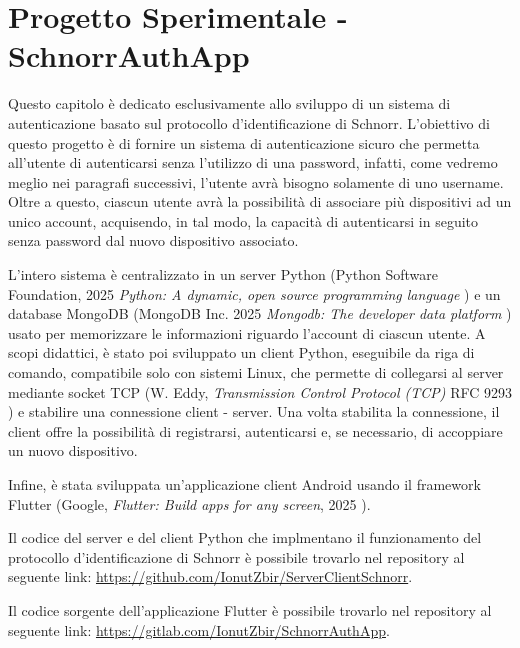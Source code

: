 \chapter{Progetto Sperimentale - SchnorrAuthApp}


Questo capitolo è dedicato esclusivamente allo sviluppo di un sistema di autenticazione basato sul protocollo d'identificazione di Schnorr. L'obiettivo di questo progetto è di fornire un sistema di autenticazione sicuro che permetta all'utente di autenticarsi senza l'utilizzo di una password, infatti, come vedremo meglio nei paragrafi successivi, l'utente avrà bisogno solamente di uno username. Oltre a questo, ciascun utente avrà la possibilità di associare più dispositivi ad un unico account, acquisendo, in tal modo, la capacità di autenticarsi in seguito senza password dal nuovo dispositivo associato.

L'intero sistema è centralizzato in un server Python (Python Software Foundation, 2025 \textit{Python: A dynamic, open source programming
	language} \cite{python}) e un database MongoDB (MongoDB Inc. 2025 \textit{Mongodb: The developer data platform} \cite{mongodb}) usato per memorizzare le informazioni riguardo l'account di ciascun utente. A scopi didattici, è stato poi sviluppato un client Python, eseguibile da riga di comando, compatibile solo con sistemi Linux, che permette di collegarsi al server mediante socket TCP (W. Eddy, \textit{Transmission Control Protocol (TCP)} RFC 9293 \cite{rfc9293}) e stabilire una connessione client - server. Una volta stabilita la connessione, il client offre la possibilità di registrarsi, autenticarsi e, se necessario, di accoppiare un nuovo dispositivo.

Infine, è stata sviluppata un'applicazione client Android usando il framework Flutter (Google, \textit{Flutter: Build apps for any screen}, 2025 \cite{flutter}).

Il codice del server e del client Python che implmentano il funzionamento del protocollo d'identificazione di Schnorr è possibile trovarlo nel repository al seguente link: \hyperlink{https://github.com/IonutZbir/ServerClientSchnorr}{https://github.com/IonutZbir/ServerClientSchnorr}.

Il codice sorgente dell'applicazione Flutter è possibile trovarlo nel repository al seguente link: \hyperlink{https://gitlab.com/IonutZbir/SchnorrAuthApp}{https://gitlab.com/IonutZbir/SchnorrAuthApp}.

